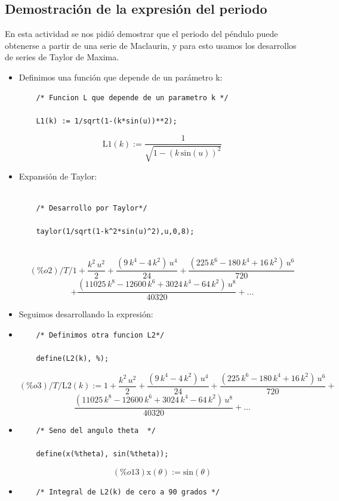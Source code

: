 \documentclass[12pt]{article}
\begin{document}
\subsection*{Demostración de la expresión del periodo}
En esta actividad se nos pidió demostrar que el periodo del péndulo puede obtenerse a partir de una serie de Maclaurin, y para esto usamos los desarrollos de series de Taylor de Maxima.
\begin{itemize}
	\item Definimos una función que depende de un parámetro k:
	\begin{verbatim}
	/* Funcion L que depende de un parametro k */
	
	L1(k) := 1/sqrt(1-(k*sin(u))**2);
	\end{verbatim}
	\[\mathrm{L1}\left( k\right) :=\frac{1}{\sqrt{1-{\left( k\,\mathrm{sin}\left( u\right) \right) }^{2}}}\]
	\item Expansión de Taylor:
	\begin{verbatim}
	
	/* Desarrollo por Taylor*/
	
	taylor(1/sqrt(1-k^2*sin(u)^2),u,0,8);
	
	\end{verbatim}
	\[(\%o2)/T/ 1+\frac{{k}^{2}\,{u}^{2}}{2}+\frac{\left( 9\,{k}^{4}-4\,{k}^{2}\right) \,{u}^{4}}{24}+\frac{\left( 225\,{k}^{6}-180\,{k}^{4}+16\,{k}^{2}\right) \,{u}^{6}}{720}\]  \[+\frac{\left( 11025\,{k}^{8}-12600\,{k}^{6}+3024\,{k}^{4}-64\,{k}^{2}\right) \,{u}^{8}}{40320}+...\]
	\item Seguimos desarrollando la expresión:
	\item \begin{verbatim}
	/* Definimos otra funcion L2*/
	
	define(L2(k), %);
	\end{verbatim}
	\[(\%o3)/T/ \mathrm{L2}\left( k\right) :=1+\frac{{k}^{2}\,{u}^{2}}{2}+\frac{\left( 9\,{k}^{4}-4\,{k}^{2}\right) \,{u}^{4}}{24}+\frac{\left( 225\,{k}^{6}-180\,{k}^{4}+16\,{k}^{2}\right) \,{u}^{6}}{720}+\]  \[\frac{\left( 11025\,{k}^{8}-12600\,{k}^{6}+3024\,{k}^{4}-64\,{k}^{2}\right) \,{u}^{8}}{40320}+...\]
	
	\item \begin{verbatim}
	/* Seno del angulo theta  */
	
	define(x(%theta), sin(%theta));
	\end{verbatim}
	\[(\%o13) \mathrm{x}\left( \theta\right) :=\mathrm{sin}\left( \theta\right) \]
	\item \begin{verbatim}
	/* Integral de L2(k) de cero a 90 grados */
	

\end{verbatim}
\end{itemize}
\end{document}
